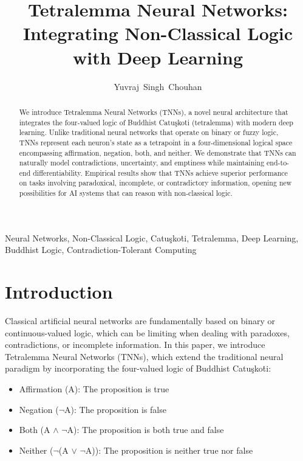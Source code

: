 \documentclass[10pt,journal,compsoc]{IEEEtran}
\begin{document}
\title{Tetralemma Neural Networks: Integrating Non-Classical Logic with Deep Learning}

\author{Yuvraj~Singh~Chouhan}

\maketitle

\begin{abstract}
We introduce Tetralemma Neural Networks (TNNs), a novel neural architecture that integrates the four-valued logic of Buddhist Catu\c{s}ko\.{t}i (tetralemma) with modern deep learning. Unlike traditional neural networks that operate on binary or fuzzy logic, TNNs represent each neuron's state as a tetrapoint in a four-dimensional logical space encompassing affirmation, negation, both, and neither. We demonstrate that TNNs can naturally model contradictions, uncertainty, and emptiness while maintaining end-to-end differentiability. Empirical results show that TNNs achieve superior performance on tasks involving paradoxical, incomplete, or contradictory information, opening new possibilities for AI systems that can reason with non-classical logic.
\end{abstract}

\begin{IEEEkeywords}
Neural Networks, Non-Classical Logic, Catu\c{s}ko\.{t}i, Tetralemma, Deep Learning, Buddhist Logic, Contradiction-Tolerant Computing
\end{IEEEkeywords}

\section{Introduction}
Classical artificial neural networks are fundamentally based on binary or continuous-valued logic, which can be limiting when dealing with paradoxes, contradictions, or incomplete information. In this paper, we introduce Tetralemma Neural Networks (TNNs), which extend the traditional neural paradigm by incorporating the four-valued logic of Buddhist Catu\c{s}ko\.{t}i:

\begin{itemize}
\item Affirmation (A): The proposition is true
\item Negation ($\neg$A): The proposition is false
\item Both (A $\wedge$ $\neg$A): The proposition is both true and false
\item Neither ($\neg$(A $\vee$ $\neg$A)): The proposition is neither true nor false
\end{itemize}
\end{document}
